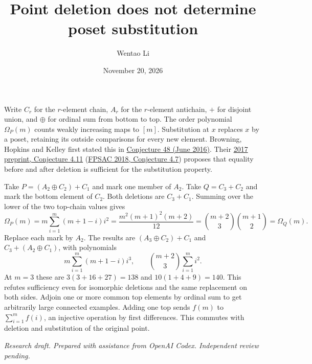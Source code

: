 \documentclass[11pt]{article}
\title{Point deletion does not determine poset substitution}
\author{Wentao Li}
\date{November 20, 2026}
\begin{document}
\maketitle

Write $C_r$ for the $r$-element chain, $A_r$ for the $r$-element antichain, $+$ for disjoint union, and $\oplus$ for ordinal sum from bottom to top. The order polynomial $\Omega_P(m)$ counts weakly increasing maps to $[m]$. Substitution at $x$ replaces $x$ by a poset, retaining its outside comparisons for every new element. Browning, Hopkins and Kelley first stated this in \href{https://sites.math.washington.edu/~reu/papers/2016/thomas/Doppelganger\%20Paper.pdf}{Conjecture 48 (June 2016)}. Their \href{https://arxiv.org/abs/1710.10407}{2017 preprint, Conjecture 4.11} (\href{https://www.mat.univie.ac.at/~slc/wpapers/FPSAC2018/80-Browning-Hopkins-Kelley.pdf}{FPSAC 2018, Conjecture 4.7}) proposes that equality before and after deletion is sufficient for the substitution property.

Take $P=(A_2\oplus C_2)+C_1$ and mark one member of $A_2$. Take $Q=C_3+C_2$ and mark the bottom element of $C_2$. Both deletions are $C_3+C_1$. Summing over the lower of the two top-chain values gives
\[
 \Omega_P(m)=m\sum_{i=1}^m(m+1-i)i^2
 =\frac{m^2(m+1)^2(m+2)}{12}
 =\binom{m+2}{3}\binom{m+1}{2}=\Omega_Q(m).
\]
Replace each mark by $A_2$. The results are $(A_3\oplus C_2)+C_1$ and $C_3+(A_2\oplus C_1)$, with polynomials
\[
 m\sum_{i=1}^m(m+1-i)i^3,\qquad
 \binom{m+2}{3}\sum_{i=1}^m i^2.
\]
At $m=3$ these are $3(3+16+27)=138$ and $10(1+4+9)=140$. This refutes sufficiency even for isomorphic deletions and the same replacement on both sides. Adjoin one or more common top elements by ordinal sum to get arbitrarily large connected examples. Adding one top sends $f(m)$ to $\sum_{i=1}^m f(i)$, an injective operation by first differences. This commutes with deletion and substitution of the original point.

\medskip\noindent\textit{Research draft. Prepared with assistance from OpenAI Codex. Independent review pending.}
\end{document}
